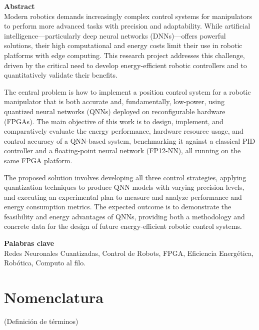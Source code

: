 \documentclass[12pt]{article}
\begin{document}
\vspace{1.5cm}
{\large \textbf{Abstract}}\\ 
Modern robotics demands increasingly complex control systems for manipulators to perform more advanced tasks with precision and adaptability. While artificial intelligence—particularly deep neural networks (DNNs)—offers powerful solutions, their high computational and energy costs limit their use in robotic platforms with edge computing. This research project addresses this challenge, driven by the critical need to develop energy-efficient robotic controllers and to quantitatively validate their benefits.

The central problem is how to implement a position control system for a robotic manipulator that is both accurate and, fundamentally, low-power, using quantized neural networks (QNNs) deployed on reconfigurable hardware (FPGAs). The main objective of this work is to design, implement, and comparatively evaluate the energy performance, hardware resource usage, and control accuracy of a QNN-based system, benchmarking it against a classical PID controller and a floating-point neural network (FP12-NN), all running on the same FPGA platform.

The proposed solution involves developing all three control strategies, applying quantization techniques to produce QNN models with varying precision levels, and executing an experimental plan to measure and analyze performance and energy consumption metrics. The expected outcome is to demonstrate the feasibility and energy advantages of QNNs, providing both a methodology and concrete data for the design of future energy-efficient robotic control systems.

\vspace{1.5cm}
{\large \textbf{Palabras clave}}\\ 
Redes Neuronales Cuantizadas, Control de Robots, FPGA, Eficiencia Energética, Robótica, Computo al filo.

\newpage
{}
\listoffigures

\newpage
{}
\listoftables

\newpage
\section*{Nomenclatura}
(Definición de términos)
\end{document}
